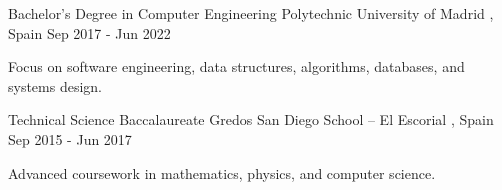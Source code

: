 

\begin{cventries}

  \cventry
    {Bachelor’s Degree in Computer Engineering} %
    {Polytechnic University of Madrid} %
    {\comMadrid, Spain} %
    {Sep 2017 - Jun 2022} %
    {
      \begin{cvitems} %
        \item {Focus on software engineering, data structures, algorithms, databases, and systems design.}
      \end{cvitems}
    }

  \cventry
    {Technical Science Baccalaureate} %
    {Gredos San Diego School – El Escorial} %
    {\comMadrid, Spain} %
    {Sep 2015 - Jun 2017} %
    {
      \begin{cvitems} %
        \item {Advanced coursework in mathematics, physics, and computer science.}
      \end{cvitems}
    }

\end{cventries}
